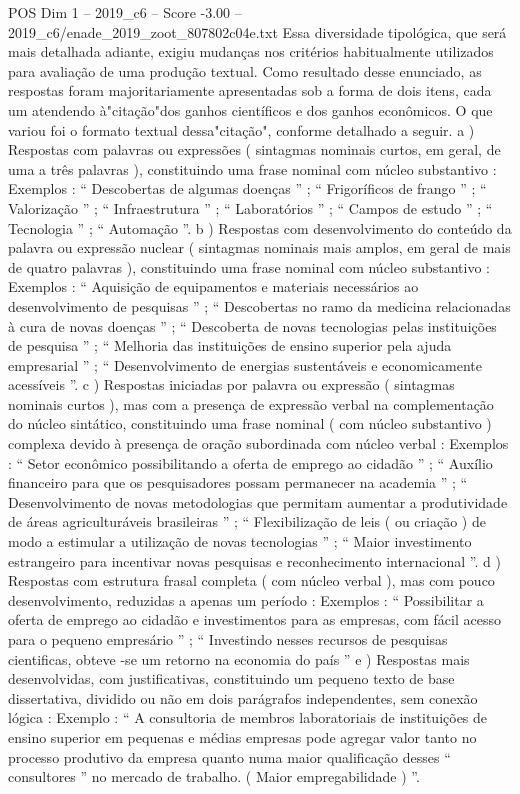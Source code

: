 \begin{textsample}{POS Dim 1 – 2019\_c6 – Score -3.00 – 2019\_c6/enade\_2019\_zoot\_807802c04e.txt}
Essa diversidade tipológica, que será mais detalhada adiante, exigiu mudanças nos critérios habitualmente utilizados para avaliação de uma produção textual.
Como resultado desse enunciado, as respostas foram majoritariamente apresentadas sob a forma de dois itens, cada um atendendo à"citação"dos ganhos científicos e dos ganhos econômicos.
O que variou foi o formato textual dessa"citação", conforme detalhado a seguir. a ) Respostas com palavras ou expressões ( sintagmas nominais curtos, em geral, de uma a três palavras ), constituindo uma frase nominal com núcleo substantivo : Exemplos : “ Descobertas de algumas doenças ” ; “ Frigoríficos de frango ” ; “ Valorização ” ; “ Infraestrutura ” ; “ Laboratórios ” ; “ Campos de estudo ” ; “ Tecnologia ” ; “ Automação ”. b ) Respostas com desenvolvimento do conteúdo da palavra ou expressão nuclear ( sintagmas nominais mais amplos, em geral de mais de quatro palavras ), constituindo uma frase nominal com núcleo substantivo : Exemplos : “ Aquisição de equipamentos e materiais necessários ao desenvolvimento de pesquisas ” ; “ Descobertas no ramo da medicina relacionadas à cura de novas doenças ” ; “ Descoberta de novas tecnologias pelas instituições de pesquisa ” ; “ Melhoria das instituições de ensino superior pela ajuda empresarial ” ; “ Desenvolvimento de energias sustentáveis e economicamente acessíveis ”. c ) Respostas iniciadas por palavra ou expressão ( sintagmas nominais curtos ), mas com a presença de expressão verbal na complementação do núcleo sintático, constituindo uma frase nominal ( com núcleo substantivo ) complexa devido à presença de oração subordinada com núcleo verbal : Exemplos : “ Setor econômico possibilitando a oferta de emprego ao cidadão ” ; “ Auxílio financeiro para que os pesquisadores possam permanecer na academia ” ; “ Desenvolvimento de novas metodologias que permitam aumentar a produtividade de áreas agriculturáveis brasileiras ” ; “ Flexibilização de leis ( ou criação ) de modo a estimular a utilização de novas tecnologias ” ; “ Maior investimento estrangeiro para incentivar novas pesquisas e reconhecimento internacional ”. d ) Respostas com estrutura frasal completa ( com núcleo verbal ), mas com pouco desenvolvimento, reduzidas a apenas um período : Exemplos : “ Possibilitar a oferta de emprego ao cidadão e investimentos para as empresas, com fácil acesso para o pequeno empresário ” ; “ Investindo nesses recursos de pesquisas cientificas, obteve -se um retorno na economia do país ” e ) Respostas mais desenvolvidas, com justificativas, constituindo um pequeno texto de base dissertativa, dividido ou não em dois parágrafos independentes, sem conexão lógica : Exemplo : “ A consultoria de membros laboratoriais de instituições de ensino superior em pequenas e médias empresas pode agregar valor tanto no processo produtivo da empresa quanto numa maior qualificação desses “ consultores ” no mercado de trabalho. ( Maior empregabilidade ) ”.

\end{textsample}
